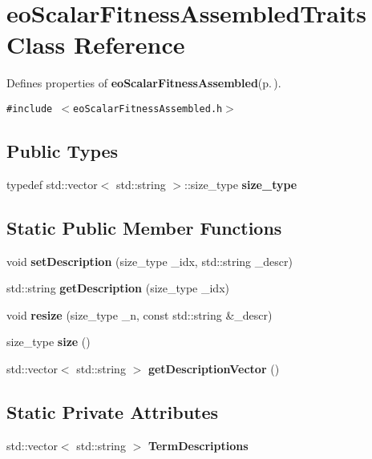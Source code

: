 \section{eo\-Scalar\-Fitness\-Assembled\-Traits Class Reference}
\label{classeo_scalar_fitness_assembled_traits}
Defines properties of {\bf eo\-Scalar\-Fitness\-Assembled}{\rm (p.\,\pageref{classeo_scalar_fitness_assembled})}.  


{\tt \#include $<$eo\-Scalar\-Fitness\-Assembled.h$>$}

\subsection*{Public Types}
\begin{CompactItemize}
\item 
typedef std::vector$<$ std::string $>$::size\_\-type {\bf size\_\-type}\label{classeo_scalar_fitness_assembled_traits_w0}

\end{CompactItemize}
\subsection*{Static Public Member Functions}
\begin{CompactItemize}
\item 
void {\bf set\-Description} (size\_\-type \_\-idx, std::string \_\-descr)\label{classeo_scalar_fitness_assembled_traits_e0}

\item 
std::string {\bf get\-Description} (size\_\-type \_\-idx)\label{classeo_scalar_fitness_assembled_traits_e1}

\item 
void {\bf resize} (size\_\-type \_\-n, const std::string \&\_\-descr)\label{classeo_scalar_fitness_assembled_traits_e2}

\item 
size\_\-type {\bf size} ()\label{classeo_scalar_fitness_assembled_traits_e3}

\item 
std::vector$<$ std::string $>$ {\bf get\-Description\-Vector} ()\label{classeo_scalar_fitness_assembled_traits_e4}

\end{CompactItemize}
\subsection*{Static Private Attributes}
\begin{CompactItemize}
\item 
std::vector$<$ std::string $>$ {\bf Term\-Descriptions}\label{classeo_scalar_fitness_assembled_traits_v0}

\end{CompactItemize}


